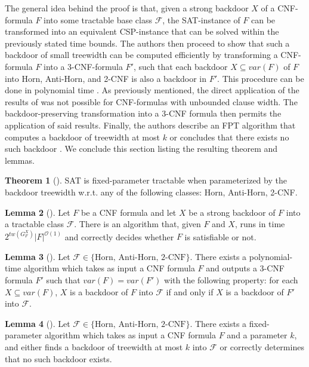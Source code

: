 \documentclass[11pt,a4paper]{article}
\theoremstyle{definition}
\theoremstyle{proposition}
\newtheorem{theorem}{Theorem}[section]
\newtheorem{lemma}[theorem]{Lemma}
\begin{document}
The general idea behind the proof is that, given a strong backdoor $X$ of a CNF-formula $F$ into some tractable base class $\mathcal{F}$, the SAT-instance of $F$ can be transformed into an equivalent CSP-instance that can be solved within the previously stated time bounds. The authors then proceed to show that such a backdoor of small treewidth can be computed efficiently by transforming a CNF-formula $F$ into a 3-CNF-formula $F'$, such that each backdoor $X \subseteq var(F)$ of $F$ into Horn, Anti-Horn, and 2-CNF is also a backdoor in $F'$. This procedure can be done in polynomial time \cite[p.28]{GanianBackdoorTreewidth}. As previously mentioned, the direct application of the results of \cite{GanianCSP} was not possible for CNF-formulas with unbounded clause width. The backdoor-preserving transformation into a 3-CNF formula then permits the application of said results. Finally, the authors describe an FPT algorithm that computes a backdoor of treewidth at most $k$ or concludes that there exists no such backdoor \cite[p.29]{GanianBackdoorTreewidth}. We conclude this section listing the resulting theorem and lemmas.  
\begin{theorem}[{\cite[Theorem 1, p.27]{GanianBackdoorTreewidth}}]
SAT is fixed-parameter tractable when parameterized by the backdoor treewidth w.r.t. any of the following classes: Horn, Anti-Horn, 2-CNF.
\end{theorem}

\begin{lemma}[{\cite[Lemma 1, p.27]{GanianBackdoorTreewidth}}]
Let $F$ be a CNF formula and let $X$ be a strong backdoor of $F$ into a tractable class $\mathcal{F}$. There is an algorithm that, given $F$ and $X$, runs in time $2^{tw(G_F^X)}|F|^{\mathcal{O}(1)}$ and correctly decides whether $F$ is satisfiable or not. 
\end{lemma}

\begin{lemma}[{\cite[Lemma 2, p.28]{GanianBackdoorTreewidth}}]
Let $\mathcal{F} \in \{\text{Horn, Anti-Horn, 2-CNF}\}$. There exists a polynomial-time algorithm which takes as input a CNF formula $F$ and outputs a 3-CNF formula $F'$ such that $var(F) = var(F')$ with the following property: for each $X \subseteq var(F)$, $X$ is a backdoor of $F$ into $\mathcal{F}$ if and only if $X$ is a backdoor of $F'$ into $\mathcal{F}$.
\end{lemma}

\begin{lemma}[{\cite[Lemma 3, p.29]{GanianBackdoorTreewidth}}]
Let $\mathcal{F} \in \{\text{Horn, Anti-Horn, 2-CNF}\}$. There exists a fixed-parameter algorithm which takes as input a CNF formula $F$ and a parameter $k$, and either finds a backdoor of treewidth at most $k$ into $\mathcal{F}$ or correctly determines that no such backdoor exists. 
\end{lemma}
\end{document}

